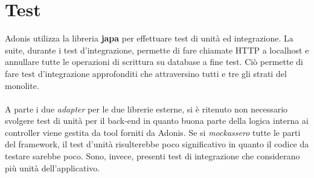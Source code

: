 \section{Test}
Adonis utilizza la libreria \textbf{japa} per effettuare test di unità ed integrazione. La suite, durante i test d'integrazione, permette di fare chiamate HTTP a localhost e annullare tutte le operazioni di scrittura su database a fine test. Ciò permette di fare test d'integrazione approfonditi che attraversino tutti e tre gli strati del monolite.
\\\\
A parte i due \textit{adapter} per le due librerie esterne, si è ritenuto non necessario svolgere test di unità per il back-end in quanto buona parte della logica interna ai controller viene gestita da tool forniti da Adonis. Se si \textit{mockassero} tutte le parti del framework, il test d'unità risulterebbe poco significativo in quanto il codice da testare sarebbe poco. Sono, invece, presenti test di integrazione che considerano più unità dell'applicativo.

